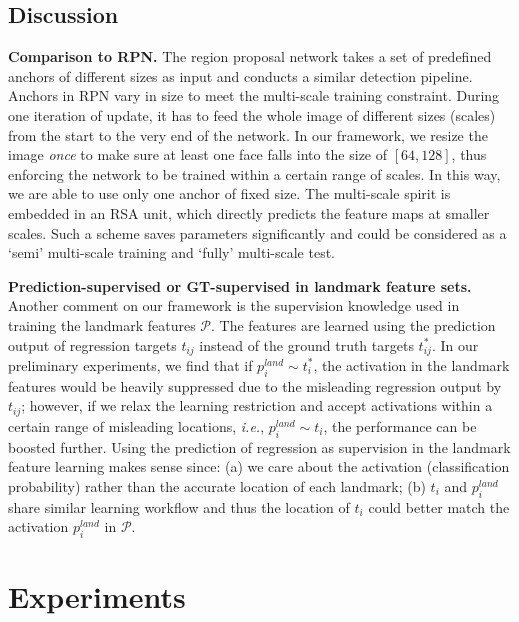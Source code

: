 \documentclass[10pt,twocolumn,letterpaper]{article}
\begin{document}
\subsection{Discussion}\label{sec:discussion}

\textbf{Comparison to RPN.}  The region proposal network \cite{faster_rcnn} takes a set of predefined anchors of different sizes as input and conducts a similar detection pipeline.
Anchors in RPN vary in size to meet the multi-scale training %
constraint. During one iteration of update, it has to feed the whole image of different sizes (scales) from the start to the very end of the network.
%
In our framework, we resize the image \textit{once} to make sure at least one face 
falls into the size of $[64, 128]$, thus enforcing the network to be trained within a certain range of scales. In this way, we are able to use only one anchor of fixed size. The multi-scale spirit is embedded in an RSA unit, which directly predicts the feature maps at smaller scales. Such a scheme saves parameters significantly and could be considered as a `semi' multi-scale training and `fully' multi-scale test. 
%

\textbf{Prediction-supervised or GT-supervised in landmark feature sets.} 
Another comment on our framework is the supervision knowledge used in training the landmark features $\mathcal{P}$. The features are learned using the prediction output of regression targets $t_{ij}$ instead of the ground truth targets $t_{ij}^*$. In our preliminary experiments, we find that if $p_i^{land}  \sim t_{i}^*$, the activation in the landmark features would be heavily suppressed due to the misleading regression output by $t_{ij}$; however, if we relax the  learning restriction and accept activations within a certain range of misleading locations, \textit{i.e.}, $p_i^{land}  \sim t_{i}$, the performance can be boosted further. Using the prediction of regression as supervision in the landmark feature learning makes sense since: (a) we care about the activation (classification probability) rather than the accurate location of each landmark; (b) $t_i$ and $p_i^{land}$ share similar learning workflow and thus the location of $t_i$ could better match the activation $p_i^{land}$ in $\mathcal{P}$.   

\section{Experiments}
\end{document}
